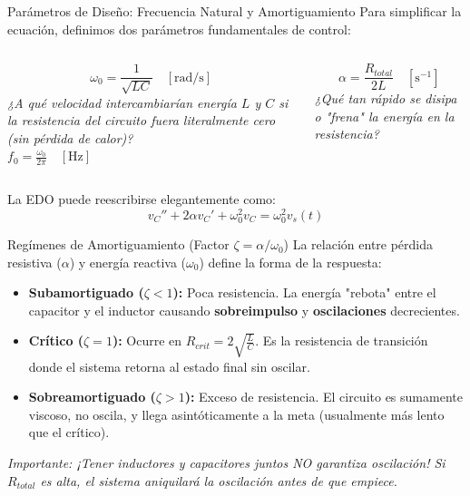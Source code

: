 \documentclass[aspectratio=169, 10pt]{beamer}
\begin{document}
\begin{frame}{Parámetros de Diseño: Frecuencia Natural y Amortiguamiento}
    Para simplificar la ecuación, definimos dos parámetros fundamentales de control:
    
    \begin{columns}[T]
        \begin{tcolorbox}[colback=white, colframe=black, title=\textbf{Frecuencia Natural no Amortiguada}]
            $$\omega_0 = \frac{1}{\sqrt{LC}} \quad [\text{rad/s}]$$
            \textit{¿A qué velocidad intercambiarían energía $L$ y $C$ si la resistencia del circuito fuera literalmente cero (sin pérdida de calor)?} \\
            $f_0 = \frac{\omega_0}{2\pi} \quad [\text{Hz}]$
        \end{tcolorbox}
        
        \begin{tcolorbox}[colback=white, colframe=black, title=\textbf{Factor de Amortiguamiento}]
            $$\alpha = \frac{R_{total}}{2L} \quad [\text{s}^{-1}]$$
            \textit{¿Qué tan rápido se disipa o "frena" la energía en la resistencia?}
        \end{tcolorbox}
    \end{columns}
    
    \vspace{0.4cm}
    La EDO puede reescribirse elegantemente como:
    $$ v_C'' + 2\alpha v_C' + \omega_0^2 v_C = \omega_0^2 v_s(t) $$
\end{frame}

\begin{frame}{Regímenes de Amortiguamiento (Factor $\zeta = \alpha / \omega_0$)}
    La relación entre pérdida resistiva ($\alpha$) y energía reactiva ($\omega_0$) define la forma de la respuesta:
    
    \vspace{0.2cm}
    \begin{itemize}
        \item \textbf{Subamortiguado ($\zeta < 1$):} Poca resistencia. La energía "rebota" entre el capacitor y el inductor causando \textbf{sobreimpulso} y \textbf{oscilaciones} decrecientes. 
        \item \textbf{Crítico ($\zeta = 1$):} Ocurre en $R_{crit} = 2\sqrt{\frac{L}{C}}$. Es la resistencia de transición donde el sistema retorna al estado final sin oscilar.
        \item \textbf{Sobreamortiguado ($\zeta > 1$):} Exceso de resistencia. El circuito es sumamente viscoso, no oscila, y llega asintóticamente a la meta (usualmente más lento que el crítico).
    \end{itemize}
    
    \vspace{0.3cm}
    \textit{Importante: ¡Tener inductores y capacitores juntos NO garantiza oscilación! Si $R_{total}$ es alta, el sistema aniquilará la oscilación antes de que empiece.}
\end{frame}
\end{document}
